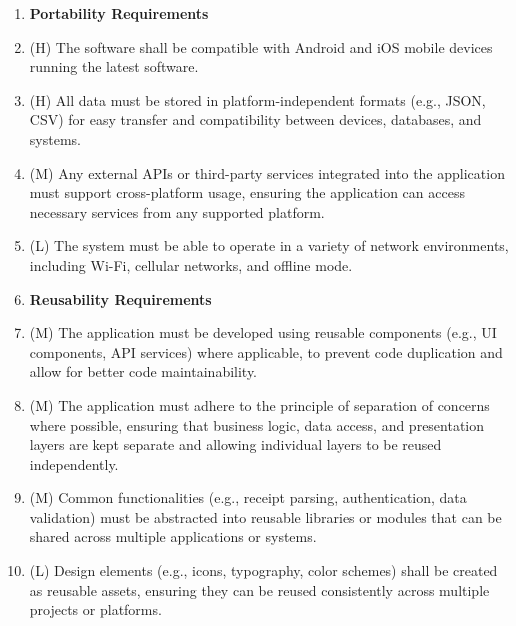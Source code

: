 \documentclass[12pt]{article}
\begin{document}
\begin{enumerate}[label=NFR\arabic*]
  \item[]  \textbf{Portability Requirements}
  \item (H) The software shall be compatible with Android and iOS mobile devices
  running the latest software.
  \item (H) All data must be stored in platform-independent formats (e.g., JSON,
  CSV) for easy transfer and compatibility between devices, databases, and
  systems.
  \item (M) Any external APIs or third-party services integrated into the
  application must support cross-platform usage, ensuring the application can
  access necessary services from any supported platform.
  \item (L) The system must be able to operate in a variety of network
  environments, including Wi-Fi, cellular networks, and offline mode.


  \item[] \textbf{Reusability Requirements} 
  \item (M) The application must be developed using reusable components (e.g.,
  UI components, API services) where applicable, to prevent code duplication and
  allow for better code maintainability.
  \item (M) The application must adhere to the principle of separation of
  concerns where possible, ensuring that business logic, data access, and
  presentation layers are kept separate and allowing individual layers to be
  reused independently.
  \item (M) Common functionalities (e.g., receipt parsing, authentication, data
  validation) must be abstracted into reusable libraries or modules that can be
  shared across multiple applications or systems.
  \item (L) Design elements (e.g., icons, typography, color schemes) shall be
  created as reusable assets, ensuring they can be reused consistently across
  multiple projects or platforms.


\end{enumerate}
\end{document}
